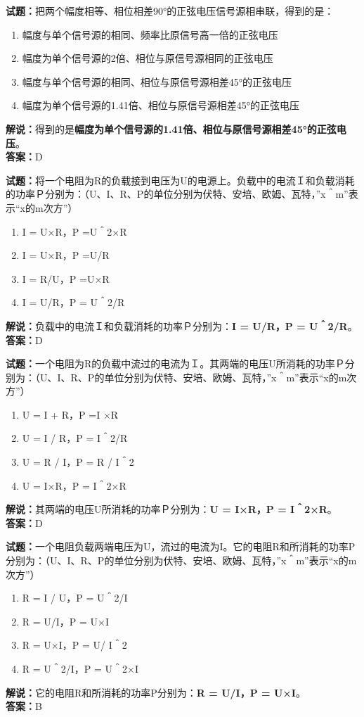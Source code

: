 \documentclass{ctexbook}
\begin{document}
\noindent\textbf{试题：}把两个幅度相等、相位相差90°的正弦电压信号源相串联，得到的是：
\begin{enumerate}[leftmargin=3em]
\item 幅度与单个信号源的相同、频率比原信号高一倍的正弦电压
\item 幅度为单个信号源的2倍、相位与原信号源相同的正弦电压
\item 幅度与单个信号源的相同、相位与原信号源相差45°的正弦电压
\item 幅度为单个信号源的1.41倍、相位与原信号源相差45°的正弦电压
\end{enumerate}
\noindent\textbf{解说：}得到的是\textbf{幅度为单个信号源的1.41倍、相位与原信号源相差45°的正弦电压}。\\\noindent\textbf{答案：}D



\bigskip


\noindent\textbf{试题：}将一个电阻为R的负载接到电压为U的电源上。负载中的电流Ｉ和负载消耗的功率Ｐ分别为：（U、I、R、P的单位分别为伏特、安培、欧姆、瓦特，”x＾m”表示“x的m次方”）
\begin{enumerate}[leftmargin=3em]
\item I = U×R，P =U＾2×R
\item I = U×R，P =U/R
\item I = R/U，P =U×R
\item I = U/R，P = U＾2/R
\end{enumerate}
\noindent\textbf{解说：}负载中的电流Ｉ和负载消耗的功率Ｐ分别为：\textbf{I = U/R，P = U＾2/R}。\\\noindent\textbf{答案：}D




\bigskip


\noindent\textbf{试题：}一个电阻为R的负载中流过的电流为Ｉ。其两端的电压U所消耗的功率Ｐ分别为：（U、I、R、P的单位分别为伏特、安培、欧姆、瓦特，”x＾m”表示“x的m次方”）
\begin{enumerate}[leftmargin=3em]
\item U = I + R，P =I ×R
\item U = I / R，P = I＾2/R
\item U = R / I，P = R / I＾2
\item U = I×R，P = I＾2×R
\end{enumerate}
\noindent\textbf{解说：}其两端的电压U所消耗的功率Ｐ分别为：\textbf{U = I×R，P = I＾2×R}。\\\noindent\textbf{答案：}D


\bigskip


\noindent\textbf{试题：}一个电阻负载两端电压为U，流过的电流为I。它的电阻R和所消耗的功率P分别为：（U、I、R、P的单位分别为伏特、安培、欧姆、瓦特，”x＾m”表示“x的m次方”）
\begin{enumerate}[leftmargin=3em]
\item R = I / U，P = U＾2/I
\item R = U/I，P = U×I
\item R = U×I，P = U/ I＾2
\item R = U＾2/I，P = U＾2×I
\end{enumerate}
\noindent\textbf{解说：}它的电阻R和所消耗的功率P分别为：\textbf{R = U/I，P = U×I}。\\\noindent\textbf{答案：}B
\end{document}
